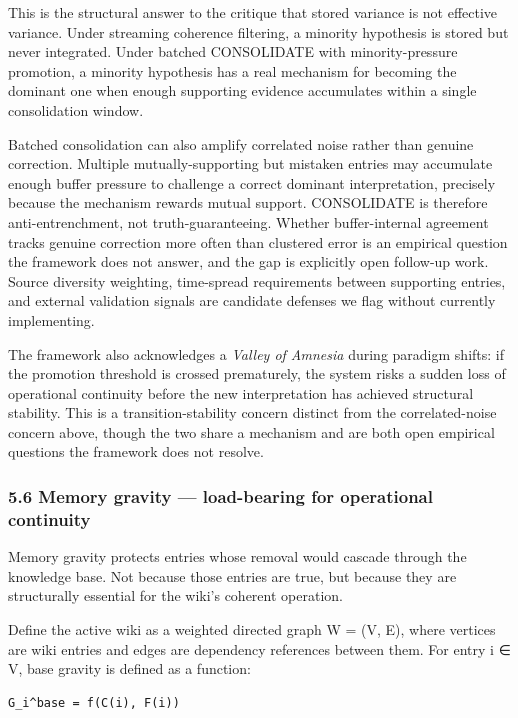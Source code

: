\documentclass[
  11pt,
]{article}
\begin{document}
This is the structural answer to the critique that stored variance is
not effective variance. Under streaming coherence filtering, a minority
hypothesis is stored but never integrated. Under batched CONSOLIDATE
with minority-pressure promotion, a minority hypothesis has a real
mechanism for becoming the dominant one when enough supporting evidence
accumulates within a single consolidation window.

Batched consolidation can also amplify correlated noise rather than
genuine correction. Multiple mutually-supporting but mistaken entries
may accumulate enough buffer pressure to challenge a correct dominant
interpretation, precisely because the mechanism rewards mutual support.
CONSOLIDATE is therefore anti-entrenchment, not truth-guaranteeing.
Whether buffer-internal agreement tracks genuine correction more often
than clustered error is an empirical question the framework does not
answer, and the gap is explicitly open follow-up work. Source diversity
weighting, time-spread requirements between supporting entries, and
external validation signals are candidate defenses we flag without
currently implementing.

The framework also acknowledges a \emph{Valley of Amnesia} during
paradigm shifts: if the promotion threshold is crossed prematurely, the
system risks a sudden loss of operational continuity before the new
interpretation has achieved structural stability. This is a
transition-stability concern distinct from the correlated-noise concern
above, though the two share a mechanism and are both open empirical
questions the framework does not resolve.

\hypertarget{memory-gravity-load-bearing-for-operational-continuity}{%
\subsubsection{5.6 Memory gravity --- load-bearing for operational
continuity}\label{memory-gravity-load-bearing-for-operational-continuity}}

Memory gravity protects entries whose removal would cascade through the
knowledge base. Not because those entries are true, but because they are
structurally essential for the wiki's coherent operation.

Define the active wiki as a weighted directed graph W = (V, E), where
vertices are wiki entries and edges are dependency references between
them. For entry i ∈ V, base gravity is defined as a function:

\begin{verbatim}
G_i^base = f(C(i), F(i))
\end{verbatim}
\end{document}
